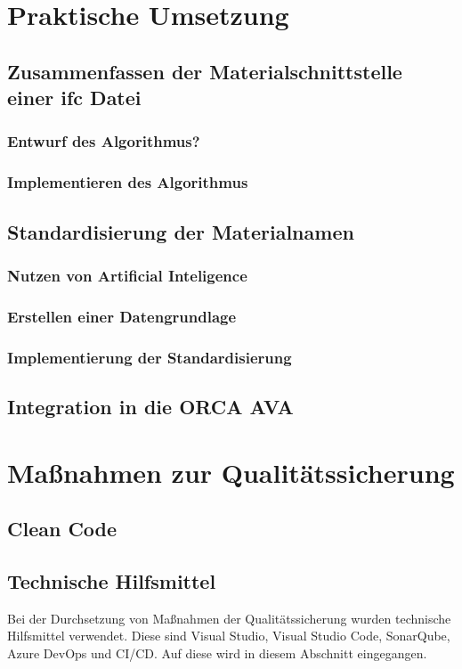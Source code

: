 \chapter{Praktische Umsetzung}
\label{c:implementation}
\section{Zusammenfassen der Materialschnittstelle einer \ac{ifc} Datei}
\subsection{Entwurf des Algorithmus?}
\subsection{Implementieren des Algorithmus}

\section{Standardisierung der Materialnamen}
\subsection{Nutzen von Artificial Inteligence}

\subsection{Erstellen einer Datengrundlage}
\subsection{Implementierung der Standardisierung}

\section{Integration in die ORCA AVA}



\chapter{Maßnahmen zur Qualitätssicherung}
\label{c:qs}
\section{Clean Code}
\label{c:qs:cleancode}
\section{Technische Hilfsmittel}
\label{c:qs:technical_aids}
Bei der Durchsetzung von Maßnahmen der Qualitätssicherung wurden technische Hilfsmittel verwendet. Diese sind Visual Studio, Visual Studio Code, SonarQube, Azure DevOps und CI/CD. Auf diese wird in diesem Abschnitt eingegangen.
